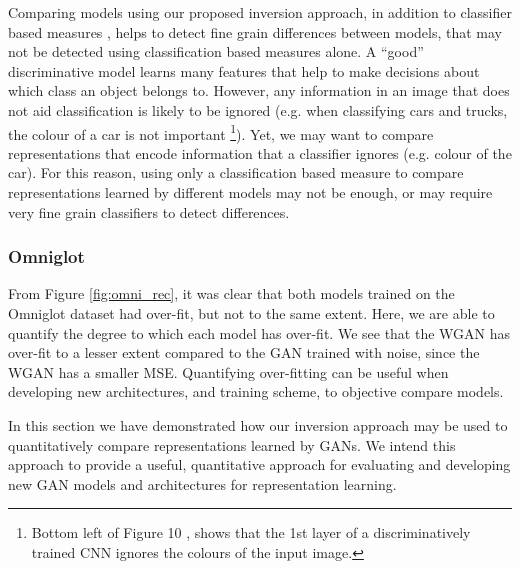 \documentclass[journal]{IEEEtran}
\begin{document}
Comparing models using our proposed inversion approach, in addition to classifier based measures \cite{salimans2016improved}, helps to detect fine grain differences between models, that may not be detected using classification based measures alone. A ``good'' discriminative model learns many features that help to make decisions about which class an object belongs to. However, any information in an image that does not aid classification is likely to be ignored (e.g. when classifying cars and trucks, the colour of a car is not important \footnote{Bottom left of Figure 10 \cite{mahendran2015understanding}, shows that the 1st layer of a discriminatively trained CNN ignores the colours of the input image.}). Yet, we may want to compare representations that encode information that a classifier ignores (e.g. colour of the car). For this reason, using only a classification based measure \cite{salimans2016improved} to compare representations learned by different models may not be enough, or may require very fine grain classifiers to detect differences.




\subsubsection{Omniglot}
From Figure \ref{fig:omni_rec}, it was clear that both models trained on the Omniglot dataset had over-fit, but not to the same extent. Here, we are able to quantify the degree to which each model has over-fit. We see that the WGAN has over-fit to a lesser extent compared to the GAN trained with noise, since the WGAN has a smaller MSE. Quantifying over-fitting can be useful when developing new architectures, and training scheme, to objective compare models.

In this section we have demonstrated how our inversion approach may be used to quantitatively compare representations learned by GANs. We intend this approach to provide a useful, quantitative approach for evaluating and developing new GAN models and architectures for representation learning.
\end{document}
